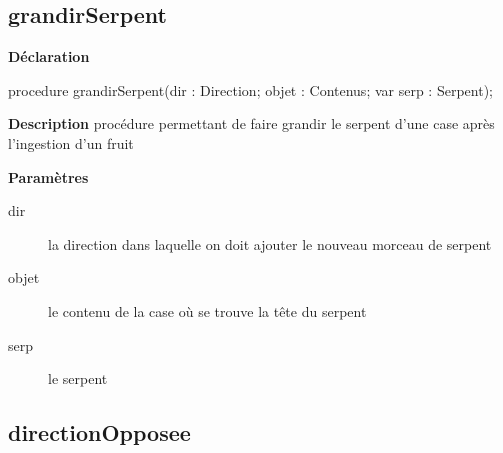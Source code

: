 \documentclass{report}
\newif\ifpdf
\begin{document}
\subsection*{grandirSerpent}
\fi
\label{Jouer-grandirSerpent}
\begin{list}{}{
\setlength{\itemindent}{0cm}
\setlength{\listparindent}{0cm}
\setlength{\leftmargin}{\evensidemargin}
\addtolength{\leftmargin}{\tmplength}
\settowidth{\labelsep}{X}
\addtolength{\leftmargin}{\labelsep}
\setlength{\labelwidth}{\tmplength}
}
\item[\textbf{Déclaration}\hfill]
\ifpdf
\begin{flushleft}
\fi
\begin{ttfamily}
procedure grandirSerpent(dir : Direction; objet : Contenus; var serp : Serpent);\end{ttfamily}

\ifpdf
\end{flushleft}
\fi

\par
\item[\textbf{Description}]
procédure permettant de faire grandir le serpent d'une case après l'ingestion d'un fruit   \par
\item[\textbf{Paramètres}]
\begin{description}
\item[dir] la direction dans laquelle on doit ajouter le nouveau morceau de serpent
\item[objet] le contenu de la case où se trouve la tête du serpent
\item[serp] le serpent
\end{description}


\end{list}
\ifpdf
\subsection*{\large{\textbf{directionOpposee}}\normalsize\hspace{1ex}\hrulefill}
\else
\end{document}
